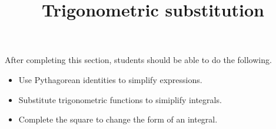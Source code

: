 \documentclass{ximera}
\title{Trigonometric substitution}
\begin{document}
\begin{abstract}
\end{abstract}

\maketitle

\begin{sectionOutcomes}

After completing this section, students should be able to do the following.

\begin{itemize}
\item Use Pythagorean identities to simplify expressions.
\item Substitute trigonometric functions to simiplify integrals.
\item Complete the square to change the form of an integral.
\end{itemize}

\end{sectionOutcomes}
\end{document}
